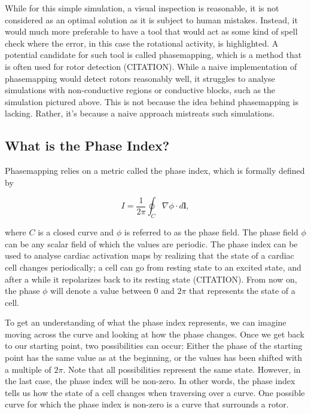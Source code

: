 \documentclass[twocolumn]{article}
\begin{document}
While for this simple simulation, a visual inspection is reasonable,
it is not considered as an optimal solution as it is subject to human mistakes.
Instead, it would much more preferable to have a tool
that would act as some kind of spell check where the error,
in this case the rotational activity, is highlighted.
A potential candidate for such tool is called phasemapping,
which is a method that is often used for rotor detection (CITATION).
While a naive implementation of phasemapping would detect rotors
reasonably well,
it struggles to analyse simulations with non-conductive regions or
conductive blocks,
such as the simulation pictured above.
This is not because the idea behind phasemapping is lacking.
Rather, it's because a naive approach mistreats such simulations.

\subsection{What is the Phase Index?}\label{what-is-the-phase-index}

Phasemapping relies on a metric called the phase index,
which is formally defined by

\begin{equation}
  I = \frac{1}{2\pi}\oint_C \nabla \phi \cdot d\bm{l} ,
  \label{eq:phase-index}
\end{equation}

\noindent where $C$ is a closed curve
and $\phi$ is referred to as the phase field.
The phase field $\phi$ can be any scalar field of which the values are periodic.
The phase index can be used to analyse cardiac activation maps
by realizing that the state of a cardiac cell changes periodically;
a cell can go from resting state to an excited state,
and after a while it repolarizes back to its resting state (CITATION).
From now on, the phase $\phi$ will denote a value between $0$ and $2\pi$
that represents the state of a cell.


To get an understanding of what the phase index represents,
we can imagine moving across the curve
and looking at how the phase changes.
Once we get back to our starting point,
two possibilities can occur:
Either the phase of the starting point has the same value as at the beginning,
or the values has been shifted with a multiple of $2\pi$.
Note that all possibilities represent the same state.
However, in the last case, the phase index will be non-zero.
In other words, the phase index tells us how the state of a cell changes when traversing over a curve.
One possible curve for which the phase index is non-zero is a curve that surrounds a rotor.
\end{document}
